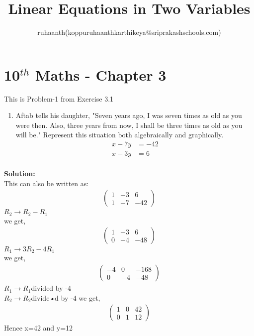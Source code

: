 \documentclass[12pt]{article}
\title{Linear Equations in Two Variables}
\author{ruhaanth(koppuruhaanthkarthikeya@sriprakashschools.com)}
\newcommand{\myvec}[1]{\ensuremath{\begin{pmatrix}#1\end{pmatrix}}}
\newcommand{\solution}{\noindent \textbf{Solution: }}
\begin{document}
\maketitle
\section*{10$^{th}$ Maths - Chapter 3}
This is Problem-1 from Exercise 3.1
\begin{enumerate}
\item Aftab tells his daughter, "Seven years ago, I was seven times as old as you were then. Also, three years from 
now, I shall be three times as old as you will be." Represent this situation both algebraically and graphically.\\
\begin{align}
  x-7y&=-42\\
x-3y&=6\\
\end{align}

\end{enumerate}
\solution\\
This can also be written as:
\begin{align}
\myvec{1&-3&6\\1&-7&-42}
\end{align}
$R_2 \xrightarrow\ R_2 - R_1$\\ 
we get,
\begin{align}
\myvec{1&-3&6\\0&-4&-48}
\end{align}
$R_1 \xrightarrow\ 3R_2 - 4R_1$\\ 
we get,
\begin{align}
\myvec{-4&0&-168\\0&-4&-48}
\end{align}
$R_1 \xrightarrow\ R_1 $divided by -4\\
$R_2 \xrightarrow\ R_2 $divide\textsl{•}d by -4
we get,
\begin{align}
\myvec{1&0&42\\0&1&12}
\end{align}
Hence x=42 and y=12
\end{document}
